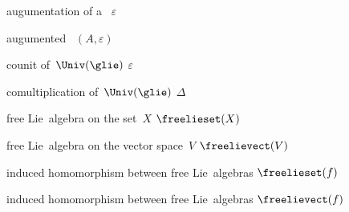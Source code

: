 {augumentation of a~\algebra{$\kf$}}
{$\varepsilon$}

{augumented~\algebra{$\kf$}}
{$(A, \varepsilon)$}

{counit of~$\Univ(\glie)$}
{$\varepsilon$}

{comultiplication of~$\Univ(\glie)$}
{$\Delta$}

{free Lie~algebra on the set~$X$}
{$\freelieset(X)$}

{free Lie~algebra on the vector space~$V$}
{$\freelievect(V)$}

{induced homomorphism between free Lie~algebras}
{$\freelieset(f)$}

{induced homomorphism between free Lie~algebras}
{$\freelievect(f)$}
